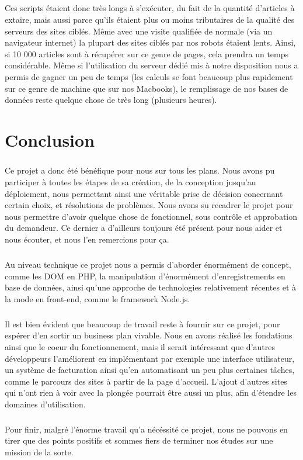 \documentclass{report}
\begin{document}
\paragraph{}
Ces scripts étaient donc très longs à s'exécuter, du fait de la quantité d'articles à extaire, mais aussi parce qu'ils étaient plus ou moins tributaires de la qualité des serveurs des sites ciblés. Même avec une visite qualifiée de normale (via un navigateur internet) la plupart des sites ciblés par nos robots étaient lents. Ainsi, si 10 000 articles sont à récupérer sur ce genre de pages, cela prendra un temps considérable. Même si l'utilisation du serveur dédié mis à notre disposition nous a permis de gagner un peu de temps (les calculs se font beaucoup plus rapidement sur ce genre de machine que sur nos Macbooks), le remplissage de nos bases de données reste quelque chose de très long (plusieurs heures).


\chapter{Conclusion}

\paragraph{}
Ce projet a donc été bénéfique pour nous sur tous les plans. Nous avons pu participer à toutes les étapes de sa création, de la conception jusqu'au déploiement, nous permettant ainsi une véritable prise de décision concernant certain choix,  et résolutions de problèmes. Nous avons su recadrer le projet pour nous permettre d'avoir quelque chose de fonctionnel, sous contrôle et approbation du demandeur. Ce dernier a d'ailleurs toujours été présent pour nous aider et nous écouter, et nous l'en remercions pour ça.

\paragraph{}
Au niveau technique ce projet nous a permis d'aborder énormément de concept, comme les DOM en PHP, la manipulation d'énormément d'enregistrements en base de données, ainsi qu'une approche de technologies relativement récentes et à la mode en front-end, comme le framework Node.js.

\paragraph{}
Il est bien évident que beaucoup de travail reste à fournir sur ce projet, pour espérer d'en sortir un business plan vivable. Nous en avons réalisé les fondations ainsi que le coeur du fonctionnement, mais il serait intéressant que d'autres développeurs l'améliorent en implémentant par exemple une interface utilisateur, un système de facturation ainsi qu'en automatisant un peu plus certaines tâches, comme le parcours des sites à partir de la page d'accueil. L'ajout d'autres sites qui n'ont rien à voir avec la plongée pourrait être aussi un plus, afin d'étendre les domaines d'utilisation.

\paragraph{}
Pour finir, malgré l'énorme travail qu'a nécéssité ce projet, nous ne pouvons en tirer que des points positifs et sommes fiers de terminer nos études sur une mission de la sorte.\\
\end{document}
